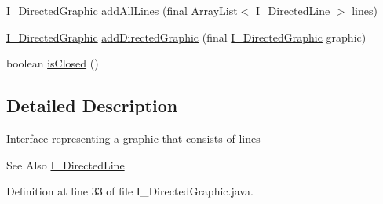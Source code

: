 \begin{DoxyCompactItemize}
\item 
\hyperlink{interfaceorg_1_1tzi_1_1use_1_1gui_1_1views_1_1diagrams_1_1util_1_1_i___directed_graphic}{I\-\_\-\-Directed\-Graphic} \hyperlink{interfaceorg_1_1tzi_1_1use_1_1gui_1_1views_1_1diagrams_1_1util_1_1_i___directed_graphic_a549c18c717cb995b01d0320404d9dced}{add\-All\-Lines} (final Array\-List$<$ \hyperlink{interfaceorg_1_1tzi_1_1use_1_1gui_1_1views_1_1diagrams_1_1util_1_1_i___directed_line}{I\-\_\-\-Directed\-Line} $>$ lines)
\item 
\hyperlink{interfaceorg_1_1tzi_1_1use_1_1gui_1_1views_1_1diagrams_1_1util_1_1_i___directed_graphic}{I\-\_\-\-Directed\-Graphic} \hyperlink{interfaceorg_1_1tzi_1_1use_1_1gui_1_1views_1_1diagrams_1_1util_1_1_i___directed_graphic_a3b4ac25c83a579d6d83773cbd137e4ee}{add\-Directed\-Graphic} (final \hyperlink{interfaceorg_1_1tzi_1_1use_1_1gui_1_1views_1_1diagrams_1_1util_1_1_i___directed_graphic}{I\-\_\-\-Directed\-Graphic} graphic)
\item 
boolean \hyperlink{interfaceorg_1_1tzi_1_1use_1_1gui_1_1views_1_1diagrams_1_1util_1_1_i___directed_graphic_a764c105860f2fccf5f8eab6d6d251d76}{is\-Closed} ()
\end{DoxyCompactItemize}


\subsection{Detailed Description}
Interface representing a graphic that consists of lines

\begin{DoxySeeAlso}{See Also}
\hyperlink{interfaceorg_1_1tzi_1_1use_1_1gui_1_1views_1_1diagrams_1_1util_1_1_i___directed_line}{I\-\_\-\-Directed\-Line} 
\end{DoxySeeAlso}


Definition at line 33 of file I\-\_\-\-Directed\-Graphic.\-java.



